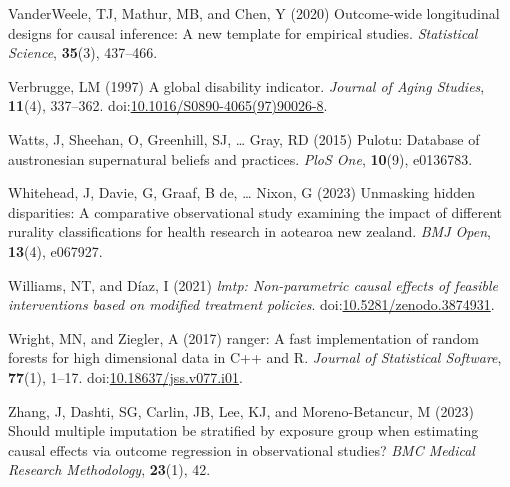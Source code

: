 \documentclass[
  single column]{article}
\newlength{\cslhangindent}
\newenvironment{CSLReferences}[2] %
 {\begin{list}{}{%
  \setlength{\itemindent}{0pt}
  \setlength{\leftmargin}{0pt}
  \setlength{\parsep}{0pt}
  \ifodd #1
   \setlength{\leftmargin}{\cslhangindent}
   \setlength{\itemindent}{-1\cslhangindent}
  \fi
  \setlength{\itemsep}{#2\baselineskip}}}
 {\end{list}}
\begin{document}
\begin{CSLReferences}{1}{0}
VanderWeele, TJ, Mathur, MB, and Chen, Y (2020) Outcome-wide
longitudinal designs for causal inference: A new template for empirical
studies. \emph{Statistical Science}, \textbf{35}(3), 437--466.

Verbrugge, LM (1997) A global disability indicator. \emph{Journal of
Aging Studies}, \textbf{11}(4), 337--362.
doi:\href{https://doi.org/10.1016/S0890-4065(97)90026-8}{10.1016/S0890-4065(97)90026-8}.

Watts, J, Sheehan, O, Greenhill, SJ, \ldots{} Gray, RD (2015) Pulotu:
Database of austronesian supernatural beliefs and practices. \emph{PloS
One}, \textbf{10}(9), e0136783.

Whitehead, J, Davie, G, Graaf, B de, \ldots{} Nixon, G (2023) Unmasking
hidden disparities: A comparative observational study examining the
impact of different rurality classifications for health research in
aotearoa new zealand. \emph{BMJ Open}, \textbf{13}(4), e067927.

Williams, NT, and Díaz, I (2021) \emph{{l}mtp: Non-parametric causal
effects of feasible interventions based on modified treatment policies}.
doi:\href{https://doi.org/10.5281/zenodo.3874931}{10.5281/zenodo.3874931}.

Wright, MN, and Ziegler, A (2017) {ranger}: A fast implementation of
random forests for high dimensional data in {C++} and {R}. \emph{Journal
of Statistical Software}, \textbf{77}(1), 1--17.
doi:\href{https://doi.org/10.18637/jss.v077.i01}{10.18637/jss.v077.i01}.

Zhang, J, Dashti, SG, Carlin, JB, Lee, KJ, and Moreno-Betancur, M (2023)
Should multiple imputation be stratified by exposure group when
estimating causal effects via outcome regression in observational
studies? \emph{BMC Medical Research Methodology}, \textbf{23}(1), 42.

\end{CSLReferences}
\end{document}
